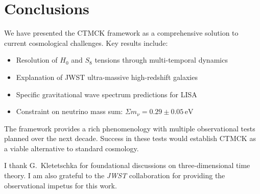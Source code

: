 \documentclass[reprint,amsmath,amssymb,aps,prd,nofootinbib,longbibliography]{revtex4-2}
\begin{document}
\section{Conclusions}

We have presented the CTMCK framework as a comprehensive solution to current cosmological challenges. Key results include:

\begin{itemize}
\item Resolution of $H_0$ and $S_8$ tensions through multi-temporal dynamics
\item Explanation of JWST ultra-massive high-redshift galaxies
\item Specific gravitational wave spectrum predictions for LISA
\item Constraint on neutrino mass sum: $\Sigma m_\nu = 0.29 \pm 0.05\,\text{eV}$
\end{itemize}

The framework provides a rich phenomenology with multiple observational tests planned over the next decade. Success in these tests would establish CTMCK as a viable alternative to standard cosmology.

\begin{acknowledgments}
I thank G.~Kletetschka for foundational discussions on three‑dimensional time theory. I am also grateful to the \textit{JWST} collaboration for providing the observational impetus for this work.
\end{acknowledgments}



\end{document}
